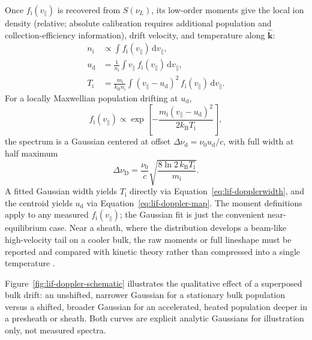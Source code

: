 Once $f_{\mathrm{i}}(v_{\parallel})$ is recovered from $S(\nu_{L})$, its low-order moments give the local ion density (relative; absolute calibration requires additional population and collection-efficiency information), drift velocity, and temperature along $\hat{\mathbf{k}}$:
\begin{align}
n_{\mathrm{i}} &\propto \int f_{\mathrm{i}}(v_{\parallel})\, \mathrm{d}v_{\parallel}, \label{eq:lif-mom0} \\
u_{\mathrm{d}} &= \frac{1}{n_{\mathrm{i}}}\int v_{\parallel}\, f_{\mathrm{i}}(v_{\parallel})\, \mathrm{d}v_{\parallel}, \label{eq:lif-mom1} \\
T_{\mathrm{i}} &= \frac{m_{\mathrm{i}}}{k_{\mathrm{B}} n_{\mathrm{i}}}\int (v_{\parallel}-u_{\mathrm{d}})^{2}\, f_{\mathrm{i}}(v_{\parallel})\, \mathrm{d}v_{\parallel}. \label{eq:lif-mom2}
\end{align}
For a locally Maxwellian population drifting at $u_{\mathrm{d}}$,
\begin{equation}
f_{\mathrm{i}}(v_{\parallel}) \propto \exp\!\left[-\frac{m_{\mathrm{i}}(v_{\parallel}-u_{\mathrm{d}})^{2}}{2 k_{\mathrm{B}} T_{\mathrm{i}}}\right],
\label{eq:lif-maxwellian}
\end{equation}
the spectrum is a Gaussian centered at offset $\Delta\nu_{\mathrm{d}} = \nu_{0} u_{\mathrm{d}}/c$, with full width at half maximum
\begin{equation}
\Delta\nu_{\mathrm{D}} = \frac{\nu_{0}}{c}\sqrt{\frac{8 \ln 2\, k_{\mathrm{B}} T_{\mathrm{i}}}{m_{\mathrm{i}}}}.
\label{eq:lif-dopplerwidth}
\end{equation}
A fitted Gaussian width yields $T_{\mathrm{i}}$ directly via Equation~\eqref{eq:lif-dopplerwidth}, and the centroid yields $u_{\mathrm{d}}$ via Equation~\eqref{eq:lif-doppler-map}. The moment definitions apply to any measured $f_{\mathrm{i}}(v_{\parallel})$; the Gaussian fit is just the convenient near-equilibrium case. Near a sheath, where the distribution develops a beam-like high-velocity tail on a cooler bulk, the raw moments or full lineshape must be reported and compared with kinetic theory rather than compressed into a single temperature \cite{ref0338}.

Figure~\ref{fig:lif-doppler-schematic} illustrates the qualitative effect of a superposed bulk drift: an unshifted, narrower Gaussian for a stationary bulk population versus a shifted, broader Gaussian for an accelerated, heated population deeper in a presheath or sheath. Both curves are explicit analytic Gaussians for illustration only, not measured spectra.

